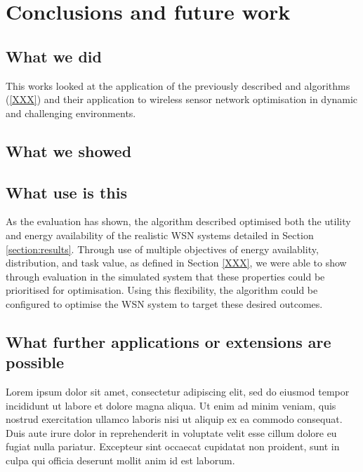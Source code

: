 \section{Conclusions and future work}
\label{section:conclusions}

\subsection{What we did}
This works looked at the application of the previously described \acronymATARIA{}{} and \acronymMGRAO{}{} algorithms (\ref{XXX}) and their application to wireless sensor network optimisation in dynamic and challenging environments.

\subsection{What we showed}


\subsection{What use is this}
As the evaluation has shown, the algorithm described optimised both the utility and energy availability of the realistic WSN systems detailed in Section \ref{section:results}. Through use of multiple objectives of energy availablity, distribution, and task value, as defined in Section \ref{XXX}, we were able to show through evaluation in the simulated system that these properties could be prioritised for optimisation. Using this flexibility, the algorithm could be configured to optimise the WSN system to target these desired outcomes.
 
\subsection{What further applications or extensions are possible}


    Lorem ipsum dolor sit amet, consectetur adipiscing elit, sed do eiusmod tempor incididunt ut labore et dolore magna aliqua. Ut enim ad minim veniam, quis nostrud exercitation ullamco laboris nisi ut aliquip ex ea commodo consequat. Duis aute irure dolor in reprehenderit in voluptate velit esse cillum dolore eu fugiat nulla pariatur. Excepteur sint occaecat cupidatat non proident, sunt in culpa qui officia deserunt mollit anim id est laborum.